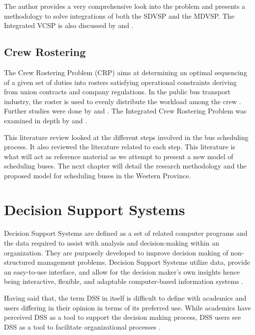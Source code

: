 \documentclass[12pt, oneside]{report}
\begin{document}
The author provides a very comprehensive look into the problem and presents a methodology to solve integrations of both the SDVSP and the MDVSP. The Integrated VCSP is also discussed by \citet{Freling2000} and \citet{Wren1997}.

\subsection {Crew Rostering}

The Crew Rostering Problem (CRP) aims at determining an optimal sequencing of a given set of duties into rosters satisfying operational constraints deriving from union contracts and company regulations. In the public bus transport industry, the roster is used to evenly distribute the workload among the crew \citep{Caprara1995}. Further studies were done by \citep{Kharraziha2003} and \citep{Tian2012}. The Integrated Crew Rostering Problem was examined in depth by \citep{Valdes2010} and \citep{Xie2012}.

This literature review looked at the different steps involved in the bus scheduling process. It also reviewed the literature related to each step. This literature is what will act as reference material as we attempt to present a new model of scheduling buses. The next chapter will detail the research methodology and the proposed model for scheduling buses in the Western Province.

\newpage

\section{Decision Support Systems}

\paragraph{ } Decision Support Systems are defined as a set of related computer programs and the data required to assist with analysis and decision-making within an organization. They are purposely developed to improve decision making of non-structured management problems. Decision Support Systems utilize data, provide an easy-to-use interface, and allow for the decision maker’s own insights hence being interactive, flexible, and adaptable computer-based information systems \citep{Turban2005}. 

Having said that, the term DSS in itself is difficult to define with academics and users differing in their opinion in terms of its preferred use. While academics have perceived DSS as a tool to support the decision making process, DSS users see DSS as a tool to facilitate organizational processes \citep{Keen1980}.
\end{document}
